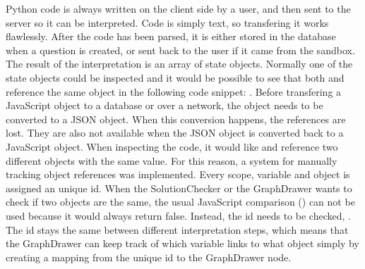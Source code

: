 Python code is always written on the client side by a user, and then sent to the server so it can be interpreted. Code is simply text, so transfering it works flawlessly. After the code has been parsed, it is either stored in the database when a question is created, or sent back to the user if it came from the sandbox. The result of the interpretation is an array of state objects. Normally one of the state objects could be inspected and it would be possible to see that both  and  reference the same object in the following code snippet:
.
Before transfering a JavaScript object to a database or over a network, the object needs to be converted to a JSON object. When this conversion happens, the references are lost. They are also not available when the JSON object is converted back to a JavaScript object. When inspecting the code, it would like  and  reference two different objects with the same value. For this reason, a system for manually tracking object references was implemented. Every scope, variable and object is assigned an unique id. When the SolutionChecker or the GraphDrawer wants to check if two objects are the same, the usual JavaScript comparison () can not be used because it would always return false. Instead, the id needs to be checked, . The id stays the same between different interpretation steps, which means that the GraphDrawer can keep track of which variable links to what object simply by creating a mapping from the unique id to the GraphDrawer node.
